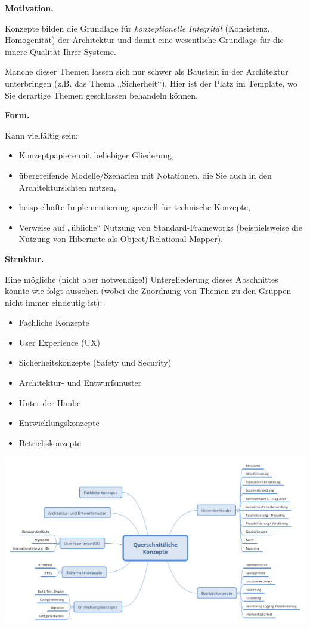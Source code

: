 \documentclass[]{article}
\begin{document}
\textbf{Motivation.}

Konzepte bilden die Grundlage für \emph{konzeptionelle Integrität}
(Konsistenz, Homogenität) der Architektur und damit eine wesentliche
Grundlage für die innere Qualität Ihrer Systeme.

Manche dieser Themen lassen sich nur schwer als Baustein in der
Architektur unterbringen (z.B. das Thema „Sicherheit``). Hier ist der
Platz im Template, wo Sie derartige Themen geschlossen behandeln können.

\textbf{Form.}

Kann vielfältig sein:

\begin{itemize}
\item
  Konzeptpapiere mit beliebiger Gliederung,
\item
  übergreifende Modelle/Szenarien mit Notationen, die Sie auch in den
  Architektursichten nutzen,
\item
  beispielhafte Implementierung speziell für technische Konzepte,
\item
  Verweise auf „übliche`` Nutzung von Standard-Frameworks
  (beispielsweise die Nutzung von Hibernate als Object/Relational
  Mapper).
\end{itemize}

\textbf{Struktur.}

Eine mögliche (nicht aber notwendige!) Untergliederung dieses
Abschnittes könnte wie folgt aussehen (wobei die Zuordnung von Themen zu
den Gruppen nicht immer eindeutig ist):

\begin{itemize}
\item
  Fachliche Konzepte
\item
  User Experience (UX)
\item
  Sicherheitskonzepte (Safety und Security)
\item
  Architektur- und Entwurfsmuster
\item
  Unter-der-Haube
\item
  Entwicklungskonzepte
\item
  Betriebskonzepte
\end{itemize}

\includegraphics{images/08-Crosscutting-Concepts-Structure-DE.png}
\end{document}
